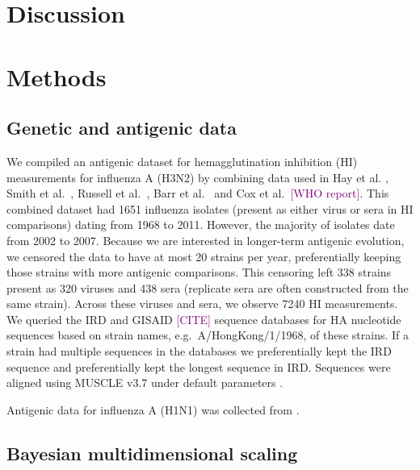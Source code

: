 \documentclass[11pt,oneside,letterpaper]{article}
\def\tbc#1{\textcolor{purple}{[#1]}}
\begin{document}
\section*{Discussion}

\section*{Methods}

\subsection*{Genetic and antigenic data}

We compiled an antigenic dataset for hemagglutination inhibition (HI) measurements for influenza A (H3N2) by combining data used in Hay et al. \cite{Hay01}, Smith et al.\ \cite{Smith04}, Russell et al.\ \cite{Russell08}, Barr et al.\ \cite{Barr10} and Cox et al.\ \tbc{WHO report}. 
This combined dataset had 1651 influenza isolates (present as either virus or sera in HI comparisons) dating from 1968 to 2011. 
However, the majority of isolates date from 2002 to 2007. 
Because we are interested in longer-term antigenic evolution, we censored the data to have at most 20 strains per year, preferentially keeping those strains with more antigenic comparisons. 
This censoring left 338 strains present as 320 viruses and 438 sera (replicate sera are often constructed from the same strain). 
Across these viruses and sera, we observe 7240 HI measurements. 
We queried the IRD \cite{IRD} and GISAID \tbc{CITE} sequence databases for HA nucleotide sequences based on strain names, e.g.\ A/HongKong/1/1968, of these strains. 
If a strain had multiple sequences in the databases we preferentially kept the IRD sequence and preferentially kept the longest sequence in IRD. 
Sequences were aligned using MUSCLE v3.7 under default parameters \cite{MUSCLE}.

Antigenic data for influenza A (H1N1) was collected from \cite{Faress05,Chakraverty82,Chakraverty86,Cox83,Daniels85,Daum02,Donatelli93,Kendal78,McDonald07,Nakajima79,Nakajima81,Pereira82,Stevens87,Webster79,Raymond86}.

\subsection*{Bayesian multidimensional scaling}
\end{document}
